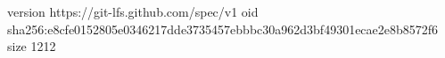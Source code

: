 version https://git-lfs.github.com/spec/v1
oid sha256:e8cfe0152805e0346217dde3735457ebbbc30a962d3bf49301ecae2e8b8572f6
size 1212
